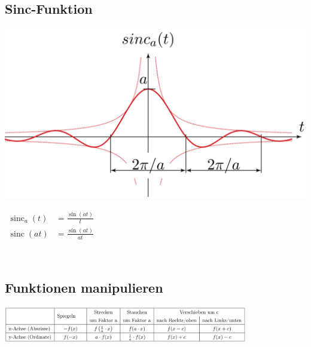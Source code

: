 	\subsection{Sinc-Funktion}
				\begin{minipage}{0.2\textwidth}
			\includegraphics[width=\textwidth]{./bilder/funktionen/sincF.png}
		\end{minipage}
		\qquad
		\begin{minipage}{0.45\textwidth}
			\begin{math}
				\begin{aligned}
					\operatorname{sinc}_{a}(t) &= \frac{\sin (a t)}{t} \\
					\operatorname{sinc}(a t) &= \frac{\sin (a t)}{a t}
				 \end{aligned}
			 \end{math}
		\end{minipage}
		\qquad
		\begin{minipage}{0.25\textwidth}						
		\end{minipage}\\
	
		
	
	
	\subsection{Funktionen manipulieren}
		\includegraphics[width=0.8\textwidth]{./bilder/funktionen/SignalManip.png}